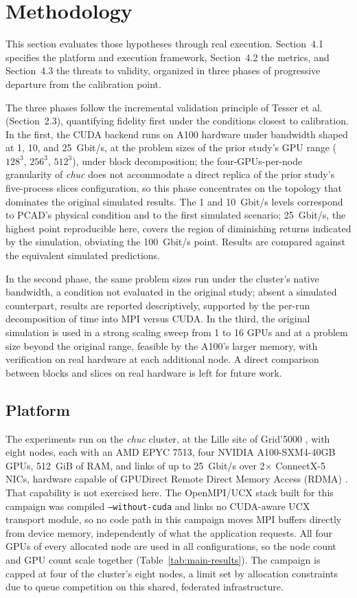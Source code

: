 \documentclass[12pt]{article}
\begin{document}
\section{Methodology}

This section evaluates those hypotheses through real execution. Section~4.1 specifies the platform and execution framework, Section~4.2 the metrics, and Section~4.3 the threats to validity, organized in three phases of progressive departure from the calibration point.

The three phases follow the incremental validation principle of Tesser et al. (Section~2.3), quantifying fidelity first under the conditions closest to calibration. In the first, the CUDA backend runs on A100 hardware under bandwidth shaped at 1, 10, and 25~Gbit/s, at the problem sizes of the prior study's GPU range ($128^3$, $256^3$, $512^3$), under block decomposition; the four-GPUs-per-node granularity of \textit{chuc} does not accommodate a direct replica of the prior study's five-process slices configuration, so this phase concentrates on the topology that dominates the original simulated results. The 1 and 10~Gbit/s levels correspond to PCAD's physical condition and to the first simulated scenario; 25~Gbit/s, the highest point reproducible here, covers the region of diminishing returns indicated by the simulation, obviating the 100~Gbit/s point. Results are compared against the equivalent simulated predictions.

In the second phase, the same problem sizes run under the cluster's native bandwidth, a condition not evaluated in the original study; absent a simulated counterpart, results are reported descriptively, supported by the per-run decomposition of time into MPI versus CUDA. In the third, the original simulation is used in a strong scaling sweep from 1 to 16 GPUs and at a problem size beyond the original range, feasible by the A100's larger memory, with verification on real hardware at each additional node. A direct comparison between blocks and slices on real hardware is left for future work.
 
\subsection{Platform}
 
The experiments run on the \textit{chuc} cluster, at the Lille site of Grid'5000 \cite{balouek2013grid5000}, with eight nodes, each with an AMD EPYC 7513, four NVIDIA A100-SXM4-40GB GPUs, 512~GiB of RAM, and links of up to 25~Gbit/s over 2$\times$ ConnectX-5 NICs, hardware capable of GPUDirect Remote Direct Memory Access (RDMA) \cite{potluri2013gpudirect}. That capability is not exercised here. The OpenMPI/UCX stack built for this campaign was compiled \texttt{--without-cuda} and links no CUDA-aware UCX transport module, so no code path in this campaign moves MPI buffers directly from device memory, independently of what the application requests. All four GPUs of every allocated node are used in all configurations, so the node count and GPU count scale together (Table~\ref{tab:main-results}). The campaign is capped at four of the cluster's eight nodes, a limit set by allocation constraints due to queue competition on this shared, federated infrastructure.
\end{document}

